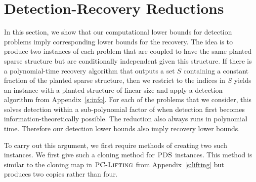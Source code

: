 \section{Detection-Recovery Reductions}
\label{s:detectionrecovery}

In this section, we show that our computational lower bounds for detection problems imply corresponding lower bounds for the recovery. The idea is to produce two instances of each problem that are coupled to have the same planted sparse structure but are conditionally independent given this structure. If there is a polynomial-time recovery algorithm that outputs a set $S$ containing a constant fraction of the planted sparse structure, then we restrict to the indices in $S$ yields an instance with a planted structure of linear size and apply a detection algorithm from Appendix~\ref{s:info}. For each of the problems that we consider, this solves detection within a sub-polynomial factor of when detection first becomes information-theoretically possible. The reduction also always runs in polynomial time. Therefore our detection lower bounds also imply recovery lower bounds.

To carry out this argument, we first require methods of creating two such instances. We first give such a cloning method for $\textsc{PDS}$ instances. This method is similar to the cloning map in $\textsc{PC-Lifting}$ from Appendix~\ref{s:lifting} but produces two copies rather than four.

